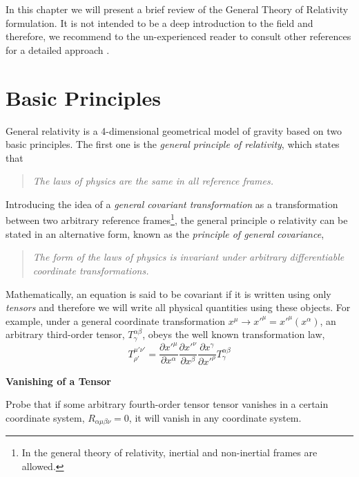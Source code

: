 In this chapter we will present a brief review of the General Theory of Relativity formulation. It is not intended to be a deep introduction to the field and therefore, we recommend to the un-experienced reader to consult other references for a detailed approach \cite{Bambi2018}.

\section{Basic Principles}

General relativity is a 4-dimensional geometrical model of gravity  based on two basic principles. The first one is the \textit{general principle of relativity}, which states that
\begin{quote}
\textit{The laws of physics are the same in all reference frames.}
\end{quote}

Introducing the idea of a \textit{general covariant transformation} as a transformation between two arbitrary reference frames\footnote{In the general theory of relativity, inertial and non-inertial frames are allowed.}, the general principle o relativity can be stated in an alternative form, known as the \textit{principle of general covariance},
\begin{quote}
\textit{The form of the laws of physics is invariant under arbitrary differentiable coordinate transformations.}
\end{quote}

Mathematically, an equation is said to be covariant if it is written using only \textit{tensors} and therefore we will write all physical quantities using these objects. For example, under a general coordinate transformation $x^\mu \rightarrow x'^\mu = x'^\mu (x^\alpha)$, an arbitrary third-order tensor, $T^{\alpha \beta}_\gamma$, obeys the well known transformation law,  
\begin{equation}
T^{\mu ' \nu '}_{\rho '} = \frac{\partial x'^\mu}{\partial x^\alpha}  \frac{\partial x'^\nu}{\partial x^\beta}  \frac{\partial x^\gamma}{\partial x'^\rho} T^{\alpha \beta}_\gamma
\end{equation}

\begin{exercise}
\textbf{Vanishing of a Tensor}

Probe that if some arbitrary fourth-order tensor tensor vanishes in a certain coordinate system, $R_{\alpha \mu \beta \nu}  = 0$, it will vanish in any coordinate system.
\end{exercise}

